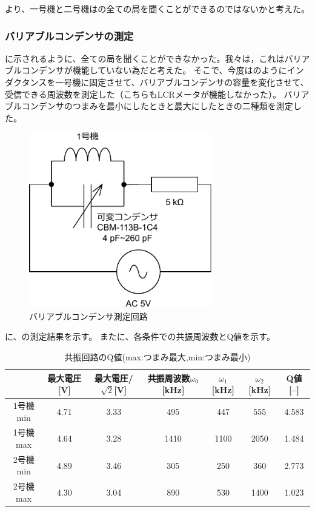 \documentclass[report.tex]{subfiles}
\begin{document}
より、一号機と二号機はの全ての局を聞くことができるのではないかと考えた。

\subsubsection{バリアブルコンデンサの測定}

に示されるように、全ての局を聞くことができなかった。我々は，これはバリアブルコンデンサが機能していない為だと考えた。
そこで、今度はのようにインダクタンスを一号機に固定させて、バリアブルコンデンサの容量を変化させて、受信できる周波数を測定した（こちらもLCRメータが機能しなかった）。
バリアブルコンデンサのつまみを最小にしたときと最大にしたときの二種類を測定した。

\begin{figure}[H]
	\centering
	\includegraphics[width=8cm]{fig/inda3.pdf}
	\caption{バリアブルコンデンサ測定回路}
	\label{fig:inda3}
\end{figure}

に、の測定結果を示す。
またに、各条件での共振周波数とQ値を示す。

\begin{table}[H]
	\centering
	\caption{共振回路のQ値(max:つまみ最大,min:つまみ最小)}
	\label{tab:Q}
	\begin{tabular}{ccccccc} \hline
		       & 最大電圧[V] & 最大電圧/\(\sqrt{2}\)[V] & 共振周波数\(\omega_0\)[kHz] & \(\omega_1\)[kHz] & \(\omega_2\)[kHz] & Q値[--] \\ \hline
		1号機min & 4.71    & 3.33                 & 495                    & 447               & 555               & 4.583  \\
		1号機max & 4.64    & 3.28                 & 1410                   & 1100              & 2050              & 1.484  \\
		2号機min & 4.89    & 3.46                 & 305                    & 250               & 360               & 2.773  \\
		2号機max & 4.30    & 3.04                 & 890                    & 530               & 1400              & 1.023  \\ \hline
	\end{tabular}
\end{table}
\end{document}
